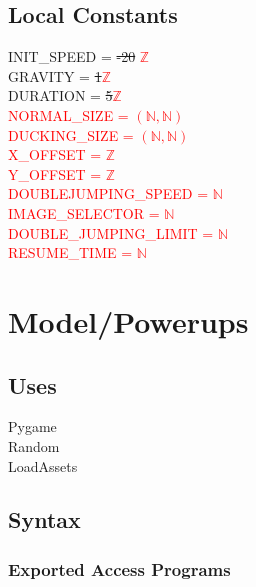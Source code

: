 \documentclass[12pt]{article}
\begin{document}
\subsection*{Local Constants}
INIT\_SPEED = \sout{-20} \textcolor{red}{$\mathbb{Z}$}\\
GRAVITY = \sout{1}\textcolor{red}{$\mathbb{Z}$}  \\
DURATION = \sout{5}\textcolor{red}{$\mathbb{Z}$} \\
\textcolor{red}{NORMAL\_SIZE = \textcolor{red}{$(\mathbb{N,N})$}\\
DUCKING\_SIZE = $(\mathbb{N,N})$\\
X\_OFFSET = $\mathbb{Z}$\\
Y\_OFFSET = $\mathbb{Z}$\\
DOUBLEJUMPING\_SPEED = $\mathbb{N}$\\
IMAGE\_SELECTOR = $\mathbb{N}$\\
DOUBLE\_JUMPING\_LIMIT = $\mathbb{N}$\\
RESUME\_TIME = $\mathbb{N}$\\}
\medskip
\newpage

\section*{Model/Powerups}

\subsection* {Uses}
Pygame\\
Random\\
LoadAssets

\subsection* {Syntax}

\subsubsection* {Exported Access Programs}
\end{document}
